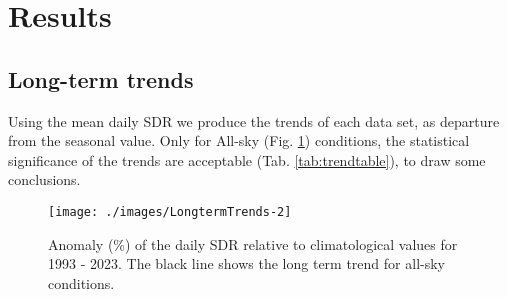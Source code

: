 \documentclass[preprint, 3p,
authoryear]{elsarticle} %
\begin{document}
\hypertarget{results}{%
\section{Results}\label{results}}

\hypertarget{long-term-trends}{%
\subsection{Long-term trends}\label{long-term-trends}}

Using the mean daily SDR we produce the trends of each data set, as
departure from the seasonal value. Only for All-sky (Fig.
\ref{fig:trendALL}) conditions, the statistical significance of the
trends are acceptable (Tab. \ref{tab:trendtable}), to draw some
conclusions.

\begin{figure}[h!]

{\centering \texttt{[image: ./images/LongtermTrends-2]} 

}

\caption{Anomaly (\%) of the daily SDR relative to climatological values for 1993 - 2023. The black line shows the long term trend for all-sky conditions.}\label{fig:trendALL}
\end{figure}
\end{document}
